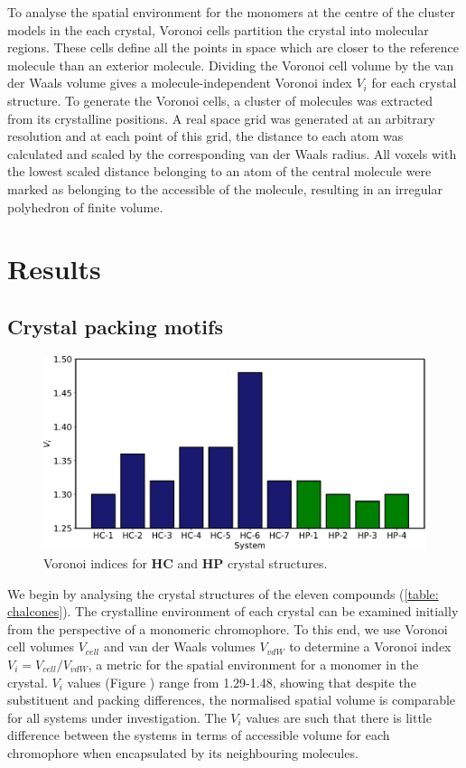 To analyse the spatial environment for the monomers at the centre of the cluster models in the each crystal, Voronoi cells partition the crystal into molecular regions. These cells define all the points in space which are closer to the reference molecule than an exterior molecule. Dividing the Voronoi cell volume by the van der Waals volume gives a molecule-independent Voronoi index $V_{i}$ for each crystal structure. To generate the Voronoi cells, a cluster of molecules was extracted from its crystalline positions. A real space grid was generated at an arbitrary resolution and at each point of this grid, the distance to each atom was calculated and scaled by the corresponding van der Waals radius. All voxels with the lowest scaled distance belonging to an atom of the central molecule were marked as belonging to the accessible of the molecule, resulting in an irregular polyhedron of finite volume. 
\section{Results}\label{section: Connecting_Results}
\subsection{Crystal packing motifs} \label{section: Connecting_Motifs}
\begin{figure}[H]
\centering
  \includegraphics[width=0.8\linewidth]{Voronoi_Index}
  \caption{Voronoi indices for \textbf{HC} and \textbf{HP} crystal structures.}
  \label{figure: voronoi_index}
\end{figure}

We begin by analysing the crystal structures of the eleven compounds (\ref{table: chalcones}). The crystalline environment of each crystal can be examined initially from the perspective of a monomeric chromophore. To this end, we use Voronoi cell volumes $V_{cell}$ and van der Waals volumes $V_{vdW}$ to determine a Voronoi index $V_{i}=V_{cell}/V_{vdW}$, a metric for the spatial environment for a monomer in the crystal. $V_{i}$ values (Figure \label{figure: voronoi_index})  range from 1.29-1.48, showing that despite the substituent and packing differences, the  normalised spatial volume is comparable for all systems under investigation.  The $V_{i}$ values are such that there is little difference between the systems in terms of accessible volume for each chromophore when encapsulated by its neighbouring molecules.

